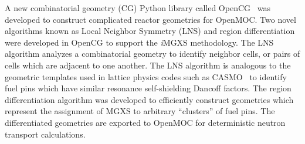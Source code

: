 \documentclass[12pt,twoside]{mitthesis-exec}
\begin{document}
A new combinatorial geometry (CG) Python library called OpenCG~\cite{boyd2015opencg} was developed to construct complicated reactor geometries for OpenMOC. Two novel algorithms known as Local Neighbor Symmetry (LNS) and region differentiation were developed in OpenCG to support the \textit{i}MGXS methodology. The LNS algorithm analyzes a combinatorial geometry to identify neighbor cells, or pairs of cells which are adjacent to one another. The LNS algorithm is analogous to the geometric templates used in lattice physics codes such as CASMO~\cite{edenius1995casmo} to identify fuel pins which have similar resonance self-shielding Dancoff factors. The region differentiation algorithm was developed to efficiently construct geometries which represent the assignment of MGXS to arbitrary ``clusters'' of fuel pins. The differentiated geometries are exported to OpenMOC for deterministic neutron transport calculations. 



%
%
%
%
%
%
\end{document}
